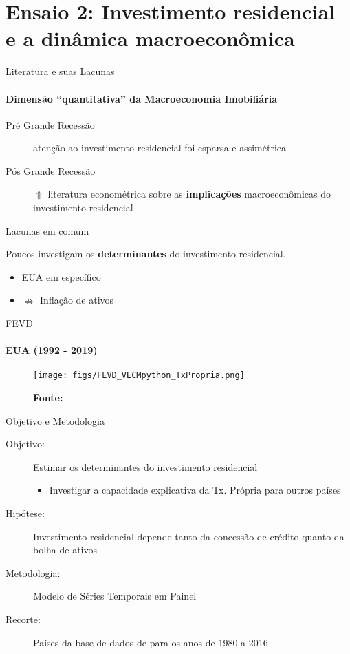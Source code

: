\section[Painel]{\textbf{Ensaio 2:} Investimento residencial e a dinâmica macroeconômica}


\begin{frame}{Literatura e suas Lacunas}
\framesubtitle{Dimensão ``quantitativa'' da Macroeconomia Imobiliária}

\begin{description}
    \item[Pré Grande Recessão] atenção ao investimento residencial foi esparsa e assimétrica
    \item[Pós Grande Recessão] $\Uparrow$ literatura econométrica sobre as \textbf{implicações} macroeconômicas do
investimento residencial
\end{description}

\begin{alert}{Lacunas em comum}

Poucos investigam os \textbf{determinantes} do investimento residencial. 

\begin{itemize}
    \item EUA em específico \cites{teixeira_crescimento_2015}{petrini_demanda_2019}
    \item \textcite{arestis_residential_2015} $\nRightarrow$ Inflação de ativos
\end{itemize}
\end{alert}
    
\end{frame}

\begin{frame}{FEVD}
\framesubtitle{EUA (1992 - 2019)}
    \begin{figure}
        \centering
        \texttt{[image: figs/FEVD\_VECMpython\_TxPropria.png]}
        \caption*{\textbf{Fonte:} \textcite{petrini_demanda_2019}}
    \end{figure}
\end{frame}

\begin{frame}{Objetivo e Metodologia}
    
\begin{description}
    \item[Objetivo:]  Estimar os determinantes do investimento residencial
    
        \begin{itemize}
            \item Investigar a capacidade explicativa da Tx. Própria para outros países
        \end{itemize}
    
    \item[Hipótese:] Investimento residencial depende tanto da concessão de crédito quanto da bolha de ativos
    \item[Metodologia:] Modelo de Séries Temporais em Painel
    \item[Recorte:] Países da base de dados de \textcite{jorda_rate_2019} para os anos de 1980 a 2016
\end{description}
\end{frame}